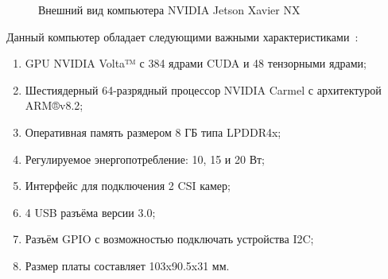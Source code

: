 \begin{figure}[ht]
    \caption{Внешний вид компьютера NVIDIA Jetson Xavier NX}\label{fig:xavier}
\end{figure}

Данный компьютер обладает следующими важными характеристиками~\cite{xavier}:

\begin{enumerate}[beginpenalty=10000] %
  \item GPU NVIDIA Volta™ с 384 ядрами CUDA и 48 тензорными ядрами;
  \item Шестиядерный 64-разрядный процессор NVIDIA Carmel с архитектурой ARM®v8.2;
  \item Оперативная память размером 8 ГБ типа LPDDR4x;
  \item Регулируемое энергопотребление: 10, 15 и 20 Вт;
  \item Интерфейс для подключения 2 CSI камер;
  \item 4 USB разъёма версии 3.0;
  \item Разъём GPIO с возможностью подключать устройства I2C;
  \item Размер платы составляет 103x90.5x31 мм.
\end{enumerate}

\FloatBarrier
